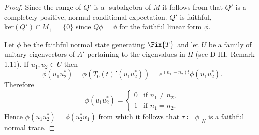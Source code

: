 \begin{proof}
Since the range of $Q'$ is a \WA-subalgebra of $M$ it follows from \citet[Theorem III.3.4]{takesaki:1979} that $Q'$ is a completely positive, normal conditional expectation.
$Q'$ is faithful, \ie $\text{ker}(Q') \cap M_{+} = \{0\}$ since $Q\phi = \phi$ for the faithful linear form $\phi$.

Let $\phi$ be the faithful normal state generating $\Fix{T}$ and let $U$ be a family of unitary eigenvectors of $A'$ pertaining to the eigenvalues in $H$ (see D-III, Remark 1.11).
If $u_{1}, u_{2} \in U$ then
\[
\phi(u_{1}u_{2}^{*}) = \phi(T_{0}(t)'(u_{1}u_{2}^{*})) = e^{(n_{1}-n_{2})t}\phi(u_{1}u_{2}^{*}).
\]
Therefore
\[
\phi(u_{1}u_{2}^{*}) = \begin{cases} 0 & \text{if } n_{1} \neq n_{2}, \\ 1 & \text{if } n_{1} = n_{2}. \end{cases}
\]
Hence $\phi(u_{1}u_{2}^{*}) = \phi(u_{2}^{*}u_{1})$ from which it follows that $\tau \coloneqq \phi|_{N}$ is a faithful normal trace.
\end{proof}
